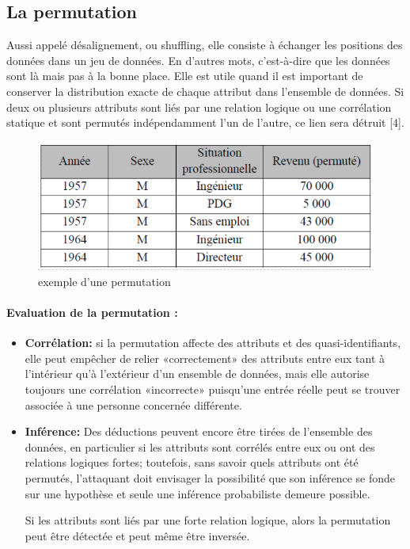 \subsection{La permutation}
Aussi appelé désalignement, ou shuffling, elle consiste à échanger les positions des données dans un jeu de données. En d’autres mots, c’est-à-dire que les données sont là mais pas à la bonne place. Elle est utile quand il est important de conserver la distribution exacte de chaque attribut dans l’ensemble de données. Si deux ou plusieurs attributs sont liés par une relation logique ou une corrélation statique et sont permutés indépendamment l’un de l’autre, ce lien sera détruit [4]. 

\begin{figure}[!h]
    \centering
     \label{exemple d'une permutation}
    \includegraphics[width=1\textwidth]{images/anonymisation/permutation_image1.png}
    \caption{exemple d'une permutation}
   
\end{figure}
\paragraph{Evaluation de la permutation : }
\begin{itemize}
    \item \textbf{Corrélation:} si la permutation affecte des attributs et des quasi-identifiants, elle peut empêcher de relier «correctement» des attributs entre eux tant à l’intérieur qu’à l’extérieur d’un ensemble de données, mais elle autorise toujours une corrélation «incorrecte» puisqu’une entrée réelle peut se trouver associée à une personne concernée différente. 

    \item \textbf{Inférence:} Des déductions peuvent encore être tirées de l’ensemble des données, en particulier si les attributs sont corrélés entre eux ou ont des relations logiques fortes; toutefois, sans savoir quels attributs ont été permutés, l’attaquant doit envisager la possibilité que son inférence se fonde sur une hypothèse et seule une inférence probabiliste demeure possible. 

Si les attributs sont liés par une forte relation logique, alors la permutation peut être détectée et peut même être inversée. 
\end{itemize}